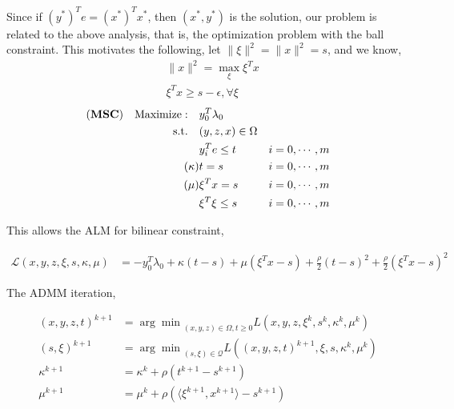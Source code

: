 \documentclass[../main]{subfiles}
\begin{document}
Since if \((y^*)^Te = (x^*)^Tx^*\), then \((x^*, y^*)\) is the solution, our problem is related to the above analysis, that is, the optimization problem with the ball constraint.
This motivates the following, let \(\|\xi\|^2 = \|x\|^2 = s\), and we know,
\begin{align}
     & \|x\|^2 = \max_\xi \xi^T x           \\
     & \xi^Tx \ge s - \epsilon, \forall \xi
\end{align}
\begin{align}
    (\textbf{MSC}) \quad \mathrm{Maximize: }\quad & y_0 ^T\lambda_0                     \\
    \mathrm{s.t.} \quad                        & (y,z,x) \in \Omega                  \\
                                               & y_i^Te \le t       & i=0, \cdots, m \\
    (\kappa)                                   & t= s               & i=0, \cdots, m \\
    (\mu)                                      & \xi^Tx = s         & i=0, \cdots, m \\
                                               & \xi^T\xi \le s     & i=0, \cdots, m
\end{align}

This allows the ALM for bilinear constraint,

\begin{align*}
    \mathscr L\left(x,y,z,\xi,s,\kappa,\mu\right) & = - y_0 ^T\lambda_0 + \kappa(t-s) + \mu(\xi^Tx - s) + \frac{\rho}{2}(t-s)^2 + \frac{\rho}{2}(\xi^Tx - s)^2
\end{align*}

The ADMM iteration,

\begin{align*}
    (x,y,z,t)^{k+1} & = {\arg\min}_{(x,y,z)\in\Omega, t\ge 0} L\left(x,y,z,\xi^k,s^k,\kappa^k,\mu^k\right)       \\
    (s, \xi)^{k+1}  & = {\arg\min}_{(s, \xi)\in\mathscr{Q}} L\left((x,y,z,t)^{k+1},\xi,s, \kappa^k, \mu^k\right) \\
    \kappa^{k+1}    & = \kappa^k + \rho\left(t^{k+1}-s^{k+1}\right)                                              \\
    \mu^{k+1}       & = \mu^k + \rho\left( \langle\xi^{k+1}, x^{k+1}\rangle - s^{k+1}\right)                     \\
\end{align*}
\end{document}
